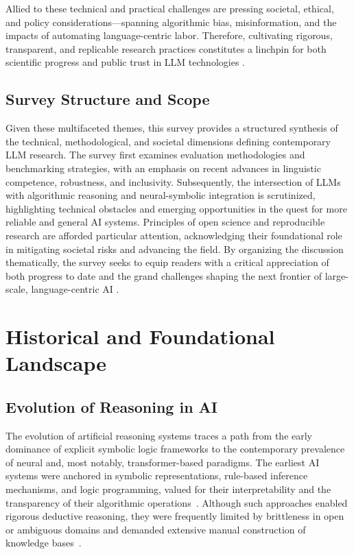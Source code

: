 \documentclass[sigconf]{acmart}
\begin{document}
Allied to these technical and practical challenges are pressing societal, ethical, and policy considerations—spanning algorithmic bias, misinformation, and the impacts of automating language-centric labor. Therefore, cultivating rigorous, transparent, and replicable research practices constitutes a linchpin for both scientific progress and public trust in LLM technologies \cite{ref42,ref54,ref86}.

\subsection{Survey Structure and Scope}

Given these multifaceted themes, this survey provides a structured synthesis of the technical, methodological, and societal dimensions defining contemporary LLM research. The survey first examines evaluation methodologies and benchmarking strategies, with an emphasis on recent advances in linguistic competence, robustness, and inclusivity. Subsequently, the intersection of LLMs with algorithmic reasoning and neural-symbolic integration is scrutinized, highlighting technical obstacles and emerging opportunities in the quest for more reliable and general AI systems. Principles of open science and reproducible research are afforded particular attention, acknowledging their foundational role in mitigating societal risks and advancing the field. By organizing the discussion thematically, the survey seeks to equip readers with a critical appreciation of both progress to date and the grand challenges shaping the next frontier of large-scale, language-centric AI \cite{ref42,ref49,ref54,ref86}.

\section{Historical and Foundational Landscape}

\subsection{Evolution of Reasoning in AI}

The evolution of artificial reasoning systems traces a path from the early dominance of explicit symbolic logic frameworks to the contemporary prevalence of neural and, most notably, transformer-based paradigms. The earliest AI systems were anchored in symbolic representations, rule-based inference mechanisms, and logic programming, valued for their interpretability and the transparency of their algorithmic operations~\cite{ref42,ref49,ref54,ref86}. Although such approaches enabled rigorous deductive reasoning, they were frequently limited by brittleness in open or ambiguous domains and demanded extensive manual construction of knowledge bases~\cite{ref86}.
\end{document}
